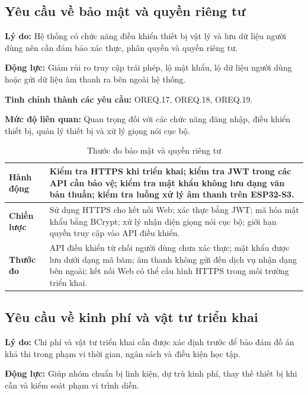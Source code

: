 \documentclass[a4paper,12pt]{article}
\begin{document}
\subsection{Yêu cầu về bảo mật và quyền riêng tư}

\textbf{Lý do:} Hệ thống có chức năng điều khiển thiết bị vật lý và lưu dữ liệu người dùng nên cần đảm bảo xác thực, phân quyền và quyền riêng tư.

\textbf{Động lực:} Giảm rủi ro truy cập trái phép, lộ mật khẩu, lộ dữ liệu người dùng hoặc gửi dữ liệu âm thanh ra bên ngoài hệ thống.

\textbf{Tinh chỉnh thành các yêu cầu:} OREQ.17, OREQ.18, OREQ.19.

\textbf{Mức độ liên quan:} Quan trọng đối với các chức năng đăng nhập, điều khiển thiết bị, quản lý thiết bị và xử lý giọng nói cục bộ.

\begin{table}[H]
\centering
\caption{Thước đo bảo mật và quyền riêng tư}
\small
\begin{tabularx}{\linewidth}{|p{3cm}|X|}
\hline
\textbf{Hành động} & Kiểm tra HTTPS khi triển khai; kiểm tra JWT trong các API cần bảo vệ; kiểm tra mật khẩu không lưu dạng văn bản thuần; kiểm tra luồng xử lý âm thanh trên ESP32-S3. \\
\hline
\textbf{Chiến lược} & Sử dụng HTTPS cho kết nối Web; xác thực bằng JWT; mã hóa mật khẩu bằng BCrypt; xử lý nhận diện giọng nói cục bộ; giới hạn quyền truy cập vào API điều khiển. \\
\hline
\textbf{Thước đo} & API điều khiển từ chối người dùng chưa xác thực; mật khẩu được lưu dưới dạng mã băm; âm thanh không gửi đến dịch vụ nhận dạng bên ngoài; kết nối Web có thể cấu hình HTTPS trong môi trường triển khai. \\
\hline
\end{tabularx}
\end{table}

\subsection{Yêu cầu về kinh phí và vật tư triển khai}

\textbf{Lý do:} Chi phí và vật tư triển khai cần được xác định trước để bảo đảm đồ án khả thi trong phạm vi thời gian, ngân sách và điều kiện học tập.

\textbf{Động lực:} Giúp nhóm chuẩn bị linh kiện, dự trù kinh phí, thay thế thiết bị khi cần và kiểm soát phạm vi trình diễn.
\end{document}
